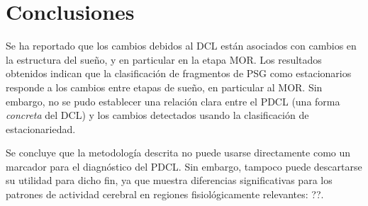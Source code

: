 %


\section{Conclusiones}

Se ha reportado que los cambios debidos al DCL están asociados con cambios en la estructura del sueño, y en particular en la etapa MOR.
%
Los resultados obtenidos indican que la clasificación de fragmentos de PSG como estacionarios responde a los cambios entre etapas de sueño, en particular al MOR.
%
Sin embargo, no se pudo establecer una relación clara entre el PDCL (una forma \textit{concreta} del DCL) y los cambios detectados usando la clasificación de estacionariedad.

Se concluye que la metodología descrita no puede usarse directamente como un marcador para el diagnóstico del PDCL.
%
Sin embargo, tampoco puede descartarse su utilidad para dicho fin, ya que muestra diferencias significativas para los patrones de actividad cerebral en regiones fisiológicamente relevantes: ??.


